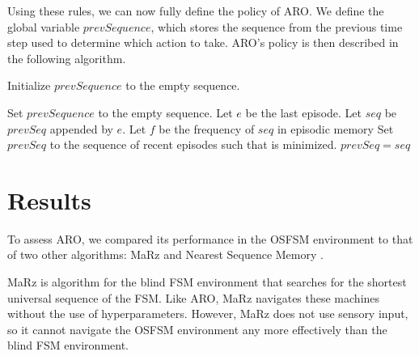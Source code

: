 \documentclass[letterpaper]{article} %
\begin{document}
Using these rules, we can now fully define the policy of ARO. We define the global variable $prevSequence$, which stores the sequence from the previous time step used to determine which action to take. ARO's policy is then described in the following algorithm.



\begin{algorithmic}
	
	\State Initialize $prevSequence$ to the empty sequence.

			\State Set $prevSequence$ to the empty sequence.
			\State \Return
		\EndIf
		\State Let $e$ be the last episode.
		\State Let $seq$ be $prevSeq$ appended by $e$.
		\State Let $f$ be the frequency of $seq$ in episodic memory
			\State Set $prevSeq$ to the sequence of recent episodes such that  is minimized.
			\State \Return {}
		\Else
			\State $prevSeq = seq$
			\State \Return {}
		\EndIf
		
	\EndFunction
	
\end{algorithmic}



\section{Results}

To assess ARO, we compared its performance in the OSFSM environment to
that of two other algorithms: MaRz \cite{Rodriguez17} and Nearest
Sequence Memory \cite{McCallum95}.

MaRz is algorithm for the blind FSM environment that searches for the
shortest universal sequence of the FSM. Like ARO, MaRz navigates these
machines without the use of hyperparameters. However, MaRz does not use
sensory input, so it cannot navigate the OSFSM environment any more effectively
than the blind FSM environment. 
\end{document}
